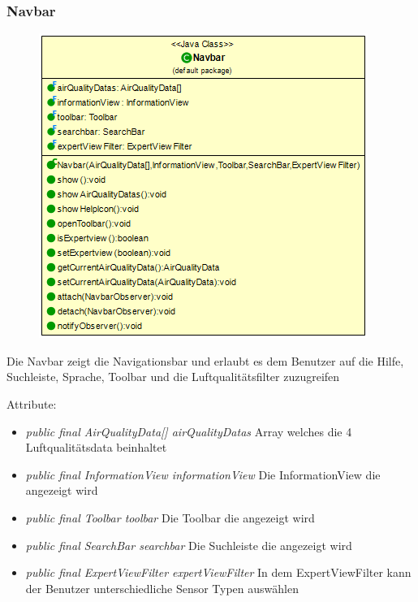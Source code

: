 \subsubsection{Navbar}
\begin{minipage}{0.5\textwidth}
    \begin{figure}[H]
        {\centering\includegraphics[scale = 0.45
        ]{media/view/navbar/Navbar_Class.png}}
    \end{figure}
    \end{minipage} \hfill
    \begin{minipage}{0.5\textwidth}
Die Navbar zeigt die Navigationsbar und erlaubt es dem Benutzer auf die Hilfe, Suchleiste, Sprache, Toolbar und die Luftqualitätsfilter zuzugreifen
\end{minipage}
Attribute:\begin{itemize} [noitemsep]
    \item \emph{public final AirQualityData[] airQualityDatas} Array welches die 4 Luftqualitätsdata beinhaltet
    \item \emph{public final InformationView informationView} Die InformationView die angezeigt wird
    \item \emph{public final Toolbar toolbar} Die Toolbar die angezeigt wird
    \item \emph{public final SearchBar searchbar} Die Suchleiste die angezeigt wird
    \item \emph{public final ExpertViewFilter expertViewFilter} In dem ExpertViewFilter kann der Benutzer unterschiedliche Sensor Typen auswählen
\end{itemize}
